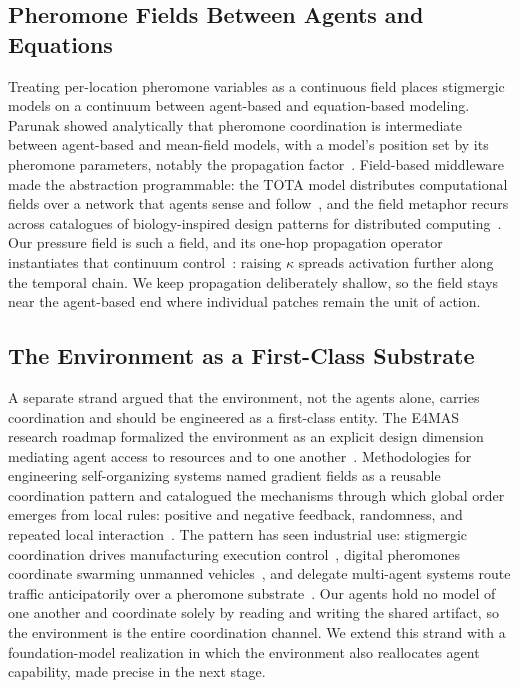 \subsection{Pheromone Fields Between Agents and Equations}

Treating per-location pheromone variables as a continuous field places stigmergic models on a continuum between agent-based and equation-based modeling. Parunak showed analytically that pheromone coordination is intermediate between agent-based and mean-field models, with a model's position set by its pheromone parameters, notably the propagation factor~\cite{parunak2011mean}. Field-based middleware made the abstraction programmable: the TOTA model distributes computational fields over a network that agents sense and follow~\cite{mamei2009tota}, and the field metaphor recurs across catalogues of biology-inspired design patterns for distributed computing~\cite{babaoglu2006patterns}. Our pressure field is such a field, and its one-hop propagation operator instantiates that continuum control~\cite{parunak2011mean}: raising $\kappa$ spreads activation further along the temporal chain. We keep propagation deliberately shallow, so the field stays near the agent-based end where individual patches remain the unit of action.

\subsection{The Environment as a First-Class Substrate}

A separate strand argued that the environment, not the agents alone, carries coordination and should be engineered as a first-class entity. The E4MAS research roadmap formalized the environment as an explicit design dimension mediating agent access to resources and to one another~\cite{weyns2015environment}. Methodologies for engineering self-organizing systems named gradient fields as a reusable coordination pattern and catalogued the mechanisms through which global order emerges from local rules: positive and negative feedback, randomness, and repeated local interaction~\cite{dewolf2005engineering,serugendo2005selforganisation}. The pattern has seen industrial use: stigmergic coordination drives manufacturing execution control~\cite{hadeli2004stigmergy,valckenaers2015design}, digital pheromones coordinate swarming unmanned vehicles~\cite{sauter2005pheromones}, and delegate multi-agent systems route traffic anticipatorily over a pheromone substrate~\cite{claes2011anticipatory}. Our agents hold no model of one another and coordinate solely by reading and writing the shared artifact, so the environment is the entire coordination channel. We extend this strand with a foundation-model realization in which the environment also reallocates agent capability, made precise in the next stage.

